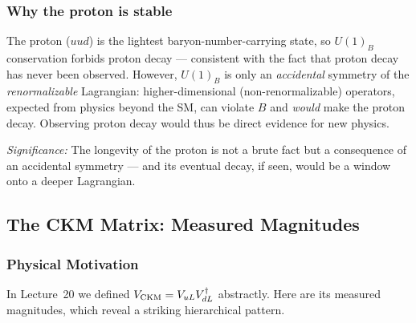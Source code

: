 \subsubsection*{Why the proton is stable}


The proton ($uud$) is the lightest baryon-number-carrying state, so
$U(1)_B$ conservation forbids proton decay --- consistent with the fact
that proton decay has never been observed. However, $U(1)_B$ is only an
\emph{accidental} symmetry of the \emph{renormalizable} Lagrangian:
higher-dimensional (non-renormalizable) operators, expected from
physics beyond the SM, can violate $B$ and \emph{would} make the proton
decay. Observing proton decay would thus be direct evidence for new
physics.

\textit{Significance:} The longevity of the proton is not a brute fact
but a consequence of an accidental symmetry --- and its eventual decay,
if seen, would be a window onto a deeper Lagrangian.

\subsection{The CKM Matrix: Measured Magnitudes}\label{subsec:lec21:ckm-values}

\subsubsection*{Physical Motivation}

In Lecture~20 we defined $V_{\rm CKM}=V_{uL}V_{dL}^\dagger$ abstractly.
Here are its measured magnitudes, which reveal a striking hierarchical
pattern.

